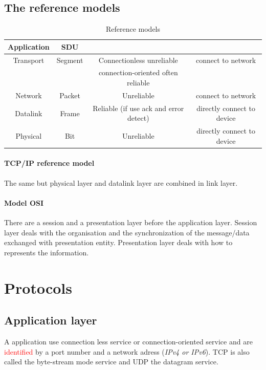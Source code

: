 \subsection{The reference models}


\begin{table}[h]
    \begin{tabular}{|c|c|c|c|}
        \hline
        Application & SDU     &                                        &  \\
        \hline
        Transport   & Segment & Connectionless unreliable              & connect to network  \\
                    &         & connection-oriented often reliable   & \\
        \hline
        Network     & Packet  & Unreliable                             & connect to network \\
        \hline
        Datalink    & Frame   & Reliable (if use ack and error detect) & directly connect to device \\
        \hline
        Physical    & Bit     & Unreliable                             & directly connect to device \\
        \hline
    \end{tabular}
    \caption{Reference models}
\end{table}

\paragraph{TCP/IP reference model} The same but physical layer and datalink layer are combined in link layer.
\paragraph{Model OSI} There are a session and a presentation layer before the application layer. Session layer deals with the organisation and the synchronization of the message/data exchanged with presentation entity. Presentation layer deals with how to represents the information. 

\section{Protocols}

\subsection{Application layer}
A application use connection less service or connection-oriented service
and are \textcolor{red}{identified} by a port number and a network adress (\textit{IPv4 or IPv6}). TCP is also called the byte-stream mode service and UDP the datagram service.

